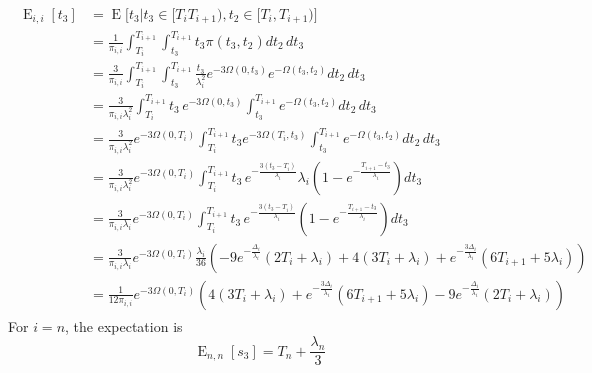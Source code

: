 \documentclass{article}
\DeclareMathOperator{\E}{E}
\begin{document}
\begin{align}
    \begin{split}
        \E_{i,i}[t_3] &= \E\big[t_3|t_3 \in [T_i T_{i+1}),t_2 \in [T_i,T_{i+1}) \big]\\
                      &= \frac{1}{\pi_{i,i}}\int_{T_i}^{T_{i+1}}\int_{t_3}^{T_{i+1}}t_3\pi(t_3,t_2)dt_2\,dt_3\\
                      &= \frac{3}{\pi_{i,i}}\int_{T_i}^{T_{i+1}}\int_{t_3}^{T_{i+1}}
                        \frac{t_3}{\lambda_i^2}e^{-3\Omega(0,t_3)}e^{-\Omega(t_3,t_2)}dt_2\,dt_3\\
                      &= \frac{3}{\pi_{i,i}\lambda_i^2}\int_{T_i}^{T_{i+1}}
                        t_3\,e^{-3\Omega(0,t_3)}\int_{t_3}^{T_{i+1}}e^{-\Omega(t_3,t_2)}dt_2\,dt_3\\
                    &= \frac{3}{\pi_{i,i}\lambda_i^2}e^{-3\Omega(0,T_i)}\int_{T_i}^{T_{i+1}}
                        t_3e^{-3\Omega(T_i,t_3)}\int_{t_3}^{T_{i+1}}e^{-\Omega(t_3,t_2)}dt_2\,dt_3\\
                    &= \frac{3}{\pi_{i,i}\lambda_i^2}e^{-3\Omega(0,T_i)}
                        \int_{T_i}^{T_{i+1}}
                        t_3\,e^{-\frac{3(t_3-T_i)}{\lambda_i}}
                        \lambda_i\left(1-e^{-\frac{T_{i+1}-t_3}{\lambda_i}}\right)dt_3\\
                    &= \frac{3}{\pi_{i,i}\lambda_i}e^{-3\Omega(0,T_i)}
                        \int_{T_i}^{T_{i+1}}
                        t_3\,e^{-\frac{3(t_3-T_i)}{\lambda_i}}
                        \left(1-e^{-\frac{T_{i+1}-t_3}{\lambda_i}}\right)dt_3\\
                    &= \frac{3}{\pi_{i,i}\lambda_i}e^{-3\Omega(0,T_i)}
                        \frac{\lambda_i}{36}\left(
                            -9e^{-\frac{\Delta_i}{\lambda_i}}(2T_i+\lambda_i)+4(3T_i+\lambda_i)
                            + e^{-\frac{3\Delta_i}{\lambda_i}}(6T_{i+1}+5\lambda_i)
                        \right)\\
                    &= \frac{1}{12\pi_{i,i}}e^{-3\Omega(0,T_i)}
                        \left(
                            4(3T_i+\lambda_i)
                            + e^{-\frac{3\Delta_i}{\lambda_i}}(6T_{i+1}+5\lambda_i)-9e^{-\frac{\Delta_i}{\lambda_i}}(2T_i+\lambda_i)
                    \right)
    \end{split}
\end{align}
For $i = n$, the expectation is 
\begin{equation}
    \E_{n,n}[s_3] = T_n+\frac{\lambda_n}{3}
\end{equation}
\end{document}
